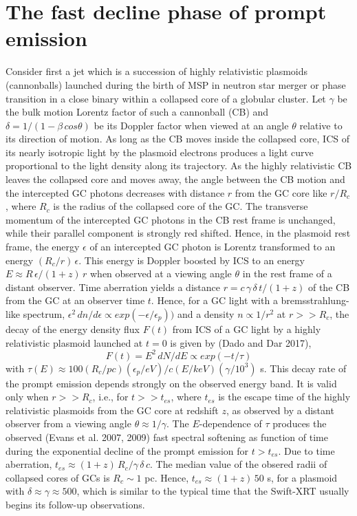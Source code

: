 \documentclass[twocolumn]{aastex61}
\begin{document}
\section{The fast decline phase of prompt emission}

Consider first a jet which is a succession of highly relativistic 
plasmoids (cannonballs) launched during the birth of MSP in neutron 
star merger or phase transition in a close binary within a collapsed 
core of a globular cluster. Let $\gamma$ be the 
bulk motion Lorentz factor of such a cannonball (CB) and 
$\delta= 1/(1-\beta\,cos\theta)$ be its Doppler factor when viewed at 
an angle $\theta$ relative to its direction of motion. As long as the 
CB moves inside the collapsed core, ICS of its 
nearly isotropic light by the plasmoid electrons produces a 
light curve proportional to the light density along its trajectory. As 
the highly relativistic CB leaves the collapsed  core and moves away, 
the angle between the CB motion and the intercepted GC photons decreases 
with distance $r$ from the GC core  like $r/R_c$, where $R_c$ is the 
radius of the collapsed core of the GC.
The transverse momentum of the intercepted GC photons in the 
CB rest frame is unchanged, while their parallel component is strongly 
red shifted. Hence, in the plasmoid rest frame, the energy $\epsilon$ 
of an intercepted GC photon is Lorentz transformed to an energy 
$(R_c/r)\,\epsilon$. This energy is Doppler boosted by ICS to an energy 
$E\approx R\,\epsilon /(1+z)\, r$ when observed at a viewing angle $\theta$ in 
the rest frame of a distant observer. Time aberration yields a distance 
$r=c\,\gamma\,\delta\,t/(1+z)$ of the CB from the GC at an observer time 
$t$. Hence, for a GC light with a bremsstrahlung-like spectrum, 
$\epsilon^2\,dn/d\epsilon\propto exp(-\epsilon/\epsilon_p))$ and a 
density $n\propto 1/r^2$ at $r >> R_c$, the decay of the energy density 
flux $F(t)$ from ICS of a GC light by a highly relativistic plasmoid launched 
at $t=0$ is given by (Dado and Dar 2017),
\begin{equation} 
F(t)=E^2\, dN/dE \propto exp(-t/\tau) 
\end{equation}
with $\tau(E)\approx 100(R_c/pc)(\epsilon_p/eV)/c(E/keV)(\gamma /10^3)$
s. This decay rate of the prompt emission depends strongly on 
the observed energy band. It is valid only when $r>>R_c$, i.e., for 
$t>>t_{es}$, where $t_{es}$ is the escape time of the highly 
relativistic plasmoids from the GC core at redshift $z$, as observed by 
a distant observer from a viewing angle $\theta \approx 1/\gamma$. 
The $E$-dependence of $\tau$ produces the observed (Evans et al.
2007, 2009) fast spectral softening as function of time 
during the exponential  decline of the prompt emission for $t>t_{es}$.
Due to time aberration, $t_{es}\approx (1 + z)\,R_c/\gamma\, \delta\, c$. 
The median value of the obsered radii of collapsed cores of GCs is 
$R_c\sim 1$ pc. Hence, $t_{es}\approx (1 + z)\,50$ s, for
a plasmoid with $\delta\approx \gamma\approx 500$, which is similar to 
the typical time that the Swift-XRT usually begins its follow-up 
observations. 
\end{document}
